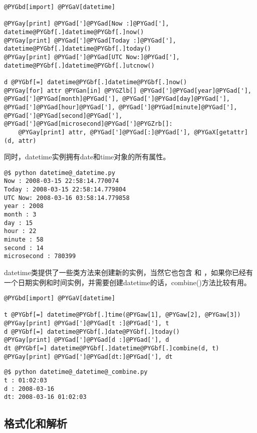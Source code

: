 \documentclass[letterpaper,10pt,english]{manual}
\begin{document}
\begin{Verbatim}[commandchars=@\[\]]
@PYGbd[import] @PYGaV[datetime]

@PYGay[print] @PYGad[']@PYGad[Now :]@PYGad['], datetime@PYGbf[.]datetime@PYGbf[.]now()
@PYGay[print] @PYGad[']@PYGad[Today :]@PYGad['], datetime@PYGbf[.]datetime@PYGbf[.]today()
@PYGay[print] @PYGad[']@PYGad[UTC Now:]@PYGad['], datetime@PYGbf[.]datetime@PYGbf[.]utcnow()

d @PYGbf[=] datetime@PYGbf[.]datetime@PYGbf[.]now()
@PYGay[for] attr @PYGan[in] @PYGZlb[] @PYGad[']@PYGad[year]@PYGad['], @PYGad[']@PYGad[month]@PYGad['], @PYGad[']@PYGad[day]@PYGad['], @PYGad[']@PYGad[hour]@PYGad['], @PYGad[']@PYGad[minute]@PYGad['], @PYGad[']@PYGad[second]@PYGad['], @PYGad[']@PYGad[microsecond]@PYGad[']@PYGZrb[]:
    @PYGay[print] attr, @PYGad[']@PYGad[:]@PYGad['], @PYGaX[getattr](d, attr)
\end{Verbatim}

同时，datetime实例拥有date和time对象的所有属性。

\begin{Verbatim}[commandchars=@\[\]]
@$ python datetime@_datetime.py
Now : 2008-03-15 22:58:14.770074
Today : 2008-03-15 22:58:14.779804
UTC Now: 2008-03-16 03:58:14.779858
year : 2008
month : 3
day : 15
hour : 22
minute : 58
second : 14
microsecond : 780399
\end{Verbatim}

datetime类提供了一些类方法来创建新的实例，当然它也包含  和  ，如果你已经有一个日期实例和时间实例，并需要创建datetime的话，combine()方法比较有用。

\begin{Verbatim}[commandchars=@\[\]]
@PYGbd[import] @PYGaV[datetime]

t @PYGbf[=] datetime@PYGbf[.]time(@PYGaw[1], @PYGaw[2], @PYGaw[3])
@PYGay[print] @PYGad[']@PYGad[t :]@PYGad['], t
d @PYGbf[=] datetime@PYGbf[.]date@PYGbf[.]today()
@PYGay[print] @PYGad[']@PYGad[d :]@PYGad['], d
dt @PYGbf[=] datetime@PYGbf[.]datetime@PYGbf[.]combine(d, t)
@PYGay[print] @PYGad[']@PYGad[dt:]@PYGad['], dt
\end{Verbatim}

\begin{Verbatim}[commandchars=@\[\]]
@$ python datetime@_datetime@_combine.py
t : 01:02:03
d : 2008-03-16
dt: 2008-03-16 01:02:03
\end{Verbatim}


\subsection{格式化和解析}
\end{document}
